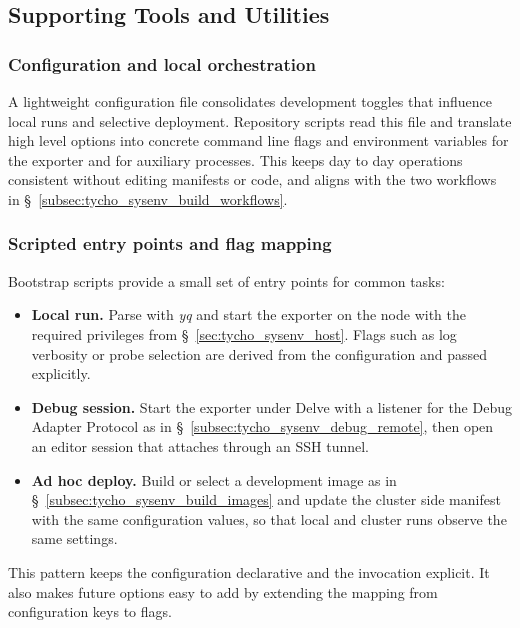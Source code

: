 \subsection{Supporting Tools and Utilities}
\label{sec:tycho_sysenv_util}

\subsubsection{Configuration and local orchestration}
\label{subsec:tycho_sysenv_util_config}
A lightweight configuration file  consolidates development toggles that influence local runs and selective deployment. Repository scripts read this file and translate high level options into concrete command line flags and environment variables for the exporter and for auxiliary processes. This keeps day to day operations consistent without editing manifests or code, and aligns with the two workflows in \S~\ref{subsec:tycho_sysenv_build_workflows}.

\subsubsection{Scripted entry points and flag mapping}
\label{subsec:tycho_sysenv_util_scripts}
Bootstrap scripts provide a small set of entry points for common tasks:
\begin{itemize}
  \item \textbf{Local run.} Parse  with \textit{yq} and start the exporter on the node with the required privileges from \S~\ref{sec:tycho_sysenv_host}. Flags such as log verbosity or probe selection are derived from the configuration and passed explicitly.
  \item \textbf{Debug session.} Start the exporter under Delve with a listener for the Debug Adapter Protocol as in \S~\ref{subsec:tycho_sysenv_debug_remote}, then open an editor session that attaches through an SSH tunnel.
  \item \textbf{Ad hoc deploy.} Build or select a development image as in \S~\ref{subsec:tycho_sysenv_build_images} and update the cluster side manifest with the same configuration values, so that local and cluster runs observe the same settings.
\end{itemize}
This pattern keeps the configuration declarative and the invocation explicit. It also makes future options easy to add by extending the mapping from configuration keys to flags.


